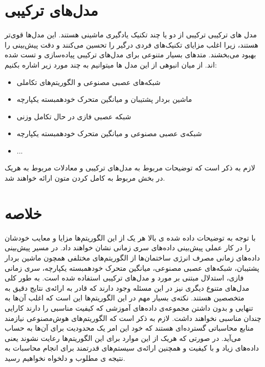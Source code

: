 \section[مدل‌های ترکیبی]{مدل‌های ترکیبی‌\protect{}}
مدل های ترکیبی ترکیبی از دو یا چند تکنیک یادگیری ماشینی هستند. این مدل‌ها قوی‌تر هستند، 
زیرا اغلب مزایای تکنیک‌های فردی درگیر را تحسین می‌کنند و دقت پیش‌بینی را بهبود می‌بخشند.
متد‌های بسیار متنوعی برای مدل‌های ترکیبی پیاده‌سازی و تست شده اند. از میان انبوهی از این مدل ها میتوانیم به چند مورد زیر اشاره بکنیم:
\begin{itemize}
    \item شبکه‌های عصبی مصنوعی و الگوریتم‌های تکاملی\cite{azadeh2007integration}
    \item ماشین بردار پشتیبان و میانگین متحرک خودهمبسته یکپارچه\cite{nie2012hybrid}
    \item شبکه عصبی فازی در حال تکامل وزنی \cite{chang2011monthly}
    \item شبکه‌ی عصبی مصنوعی و میانگین متحرک خودهمبسته یکپارچه\cite{wang2014techniques}
    \item ...
\end{itemize}

لازم به ذکر است که توضیحات مربوط به مدل‌های ترکیبی و معادلات مربوط به هریک در بخش مربوط به کامل کردن متون ارائه خواهند شد.
\section{خلاصه}

با توجه به توضیحات داده شده ی بالا هر یک از این الگوریتم‌ها مزایا و معایب خودشان را در کار عملی پیش‌بینی داده‌های سری زمانی نشان خواهند داد. 
 در مسیر پیش‌بینی داده‌های زمانی مصرف انرژی ساختمان‌ها از الگوریتم‌های مختلفی همچون 
 ماشین بردار پشتیبان، شبکه‌های عصبی مصنوعی، میانگین متحرک خودهمبسته یکپارچه، سری زمانی فازی، استدلال مبتنی بر مورد و مدل‌های ترکیبی استفاده شده است.
 به طور کلی مدل‌های متنوع دیگری نیز در این مسئله وجود دارند که قادر به ارائه‌ی نتایج دقیق به متخصصین هستند. نکته‌ی بسیار مهم در این الگوریتم‌ها این است که اغلب آن‌ها به تنهایی و بدون داشتن مجموعه‌ی داده‌های آموزشی که کیفیت مناسبی را دارند
 کارایی چندان مناسبی نخواهند داشت. لازم به ذکر است که الگوریتم‌های هوش‌مصنوعی نیازمند منابع محاسباتی گسترده‌ای هستند که خود این امر یک محدودیت برای آن‌ها به حساب می‌آید.
 در صورتی که هریک از این موارد برای این الگوریتم‌ها رعایت نشوند یعنی داده‌های زیاد و با کیفیت و همچنین ارائه‌ی سیستم‌های قدرتمند برای انجام محاسبات به نتیجه ی مطلوب و دلخواه نخواهیم رسید.
